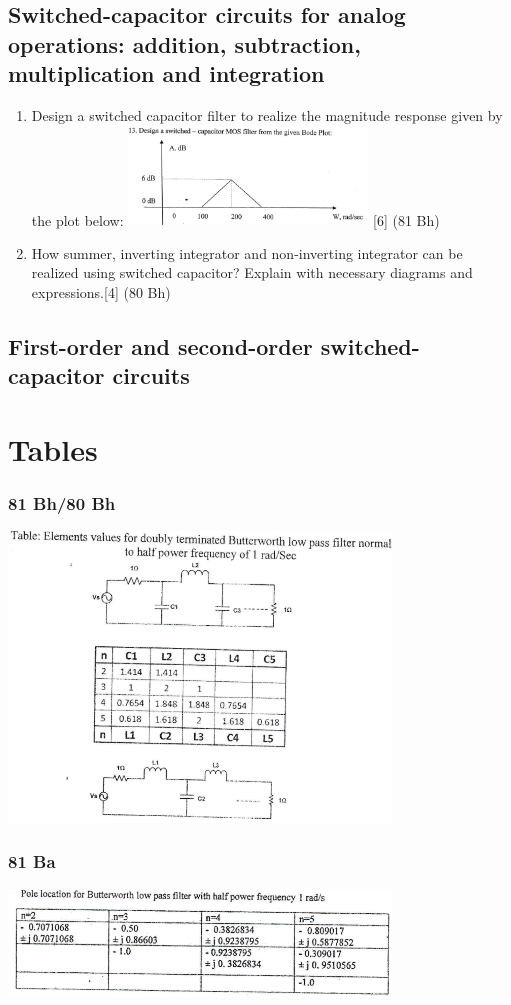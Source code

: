 \documentclass[12pt]{article}
\begin{document}
\subsection{Switched-capacitor circuits for analog operations: addition, subtraction, multiplication and integration}
\begin{enumerate}
\item Design a switched capacitor filter to realize the magnitude response given by the plot below:
\includegraphics[width=0.5\textwidth]{fd_1} \hfill [6] (81 Bh)
\item How summer, inverting integrator and non-inverting integrator can be realized using switched capacitor? Explain with necessary diagrams and expressions.\hfill [4] (80 Bh)
\end{enumerate}
\subsection{First-order and second-order switched-capacitor circuits}

\pagebreak
\section{Tables}
\label{sec:tables_81bh}
\subsubsection{81 Bh/80 Bh}
\includegraphics[width=4in]{fd_2}
\label{sec:tables_81ba}
\subsubsection{81 Ba}
\includegraphics[width=4in]{fd_3}
\label{sec:tables_80bh}
\end{document}
